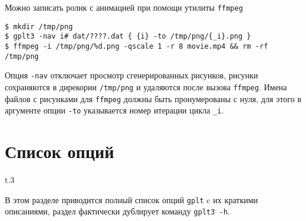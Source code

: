 \documentclass[12pt]{article}
\def\gplt{{\tt gplt}}
\begin{document}
Можно записать ролик с анимацией при помощи утилиты \verb'ffmpeg' 
\begin{verbatim}
$ mkdir /tmp/png
$ gplt3 -nav i# dat/????.dat { {i} -to /tmp/png/{_i}.png }
$ ffmpeg -i /tmp/png/%d.png -qscale 1 -r 8 movie.mp4 && rm -rf /tmp/png
\end{verbatim}
Опция \verb'-nav' отключает просмотр сгенерированных рисунков, рисунки сохраняются в дирекории \verb'/tmp/png' и удаляются после вызова \verb'ffmpeg'.
Имена файлов с рисунками для \verb'ffmpeg' должны быть пронумерованы с нуля, для этого в аргументе опции \verb'-to' указывается
номер итерации цикла \verb'_i'.

\section{Список опций}
\begin{wrapfigure}[2]{t}{.3\textwidth}
  \vphantom{.}
  \vspace{-3cm}

\end{wrapfigure}
В этом разделе приводится полный список опций \gplt{} c их краткими описаниями, раздел фактически  дублирует команду \verb'gplt3 -h'.
\end{document}
